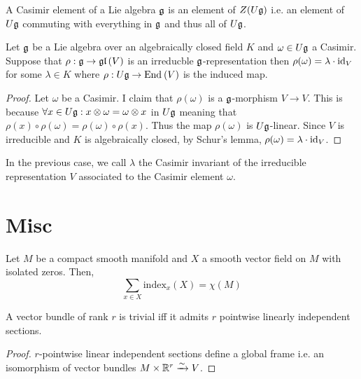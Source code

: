 \documentclass[12pt]{article}
\begin{document}
\begin{definition}
A Casimir element of a Lie algebra $\mathfrak{g}$ is an element of $Z(U \mathfrak{g})$ i.e. an element of $U \mathfrak{g}$ commuting with everything in $\mathfrak{g}$ and thus all of $U \mathfrak{g}$. 
\end{definition}

\begin{proposition}
Let $\mathfrak{g}$ be a Lie algebra over an algebraically closed field $K$ and $\omega \in U \mathfrak{g}$ a Casimir. Suppose that $\rho : \mathfrak{g} \to \mathfrak{gl}\left( V \right)$ is an irreducble $\mathfrak{g}$-representation then $\rho(\omega) = \lambda \cdot \mathrm{id}_V$ for some $\lambda \in K$ where $\rho : U \mathfrak{g} \to \mathrm{End}_{} \left( V \right)$ is the induced map.
\end{proposition}

\begin{proof}
Let $\omega$ be a Casimir. I claim that $\rho(\omega)$ is a $\mathfrak{g}$-morphism $V \to V$. This is because $\forall x \in U \mathfrak{g} : x \otimes \omega = \omega \otimes x$ in $U \mathfrak{g}$ meaning that $\rho(x) \circ \rho(\omega) = \rho(\omega) \circ \rho(x)$. Thus the map $\rho(\omega)$ is $U \mathfrak{g}$-linear. Since $V$ is irreducible and $K$ is algebraically closed, by Schur's lemma, $\rho(\omega) = \lambda \cdot \mathrm{id}_V$. 
\end{proof}

\begin{remark}
In the previous case, we call $\lambda$ the Casimir invariant of the irreducible representation $V$ associated to the Casimir element $\omega$.
\end{remark}

\section{Misc}

\begin{theorem}
Let $M$ be a compact smooth manifold and $X$ a smooth vector field on $M$ with isolated zeros. Then,
\[ \sum_{x \in X} \mathrm{index}_x(X) = \chi(M) \]
\end{theorem}

\begin{prop}
A vector bundle of rank $r$ is trivial iff it admits $r$ pointwise linearly independent sections.
\end{prop}

\begin{proof}
$r$-pointwise linear independent sections define a global frame i.e. an isomorphism of vector bundles $M \times \mathbb{R}^r \xrightarrow{\sim} V$.
\end{proof}
\end{document}
